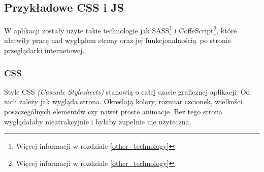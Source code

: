     

    \subsection{Przykładowe CSS i JS}
      W aplikacji zostały użyte takie technologie jak SASS\footnote{Więcej informacji w rozdziale \ref{other_technology}} i CoffeScript\footnote{Więcej informacji w rozdziale \ref{other_technology}}, które ułatwiły pracę nad wyglądem strony oraz jej funkcjonalnością po stronie przeglądarki internetowej.\\

      \subsubsection{CSS}
        Style CSS \emph{(Cascade Stylesheets)} stanowią o całej szacie graficznej aplikacji. Od nich zależy jak wygląda strona. Określają kolory, rozmiar czcionek, wielkości poszczególnych elementów czy nawet proste animacje. Bez tego strona wyglądałaby nieatrakcyjnie i byłaby zupełnie nie użyteczna.
